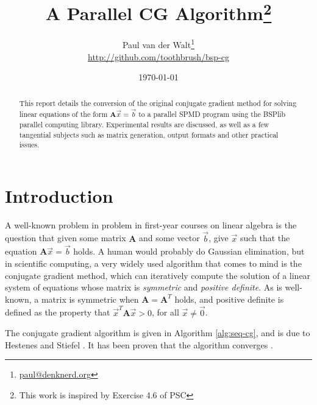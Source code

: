\documentclass[a4paper]{article}
\author{Paul van der Walt\footnote{\url{paul@denknerd.org}}\\ \url{http://github.com/toothbrush/bsp-cg}}
\date{\today}
\title{A Parallel CG Algorithm\footnote{This work is inspired by Exercise 4.6 of PSC\cite{bisseling2004parallel}}}
\newcommand{\ve}[1]{\ensuremath{\vec{#1}}}
\newcommand{\mat}[1]{\ensuremath{\boldsymbol{#1}}}
\begin{document}
\maketitle

\begin{abstract}
    This report details the conversion of the original conjugate gradient method for
    solving linear equations of the form $\mat A \ve x = \ve b$ to a parallel SPMD program
    using the BSPlib parallel computing library. Experimental results are discussed, as well
    as a few tangential subjects such as matrix generation, output formats and other practical
    issues.
\end{abstract}

\section{Introduction}

A well-known problem in problem in first-year courses on linear algebra is the question that
given some matrix \mat{A} and some vector \ve{b}, give \ve{x} such that the equation $\mat A \ve x = \ve b$ holds. A human would probably do Gaussian elimination, but
in scientific computing, a very widely used algorithm that comes to mind is the conjugate gradient method, which can iteratively compute the solution of a linear system of equations whose matrix is \emph{symmetric} and \emph{positive definite}.
As is well-known, a matrix is symmetric when $\mat A = \mat A^T$ holds, and positive definite is defined as the property that $\ve x^T \mat A \ve x > 0$, for all $\ve x \neq \ve 0$.

The conjugate gradient algorithm is given in Algorithm \ref{alg:seq-cg}, and is due to Hestenes and Stiefel \cite{hestenes1952methods}. It has been proven that the algorithm converges \cite{golub1996matrix}.
\end{document}
